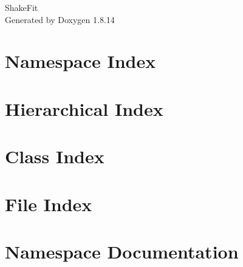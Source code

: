 \documentclass[twoside]{book}
\newcommand{\+}{\discretionary{\mbox{\scriptsize$\hookleftarrow$}}{}{}}
\newcommand{\clearemptydoublepage}{%
  \newpage{\pagestyle{empty}\cleardoublepage}%
}
\begin{document}
\hypersetup{pageanchor=false,
             bookmarksnumbered=true,
             pdfencoding=unicode
            }
\begin{titlepage}
\vspace*{7cm}
\begin{center}%
{\Large Shake\+Fit }\\
\vspace*{1cm}
{\large Generated by Doxygen 1.8.14}\\
\end{center}
\end{titlepage}
\clearemptydoublepage
{}
\tableofcontents
\clearemptydoublepage
{}
\hypersetup{pageanchor=true}

\chapter{Namespace Index}

\chapter{Hierarchical Index}

\chapter{Class Index}

\chapter{File Index}

\chapter{Namespace Documentation}











\end{document}
